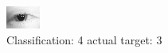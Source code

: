 \begin{figure}[h!]
\begin{center}
\includegraphics[width=0.60\columnwidth]{figures/ID61_class_4_target_3.png}
\end{center}
\caption{ Classification: 4 actual target: 3}
\label{fig:ID61_class_4_target_3}
\end{figure}
